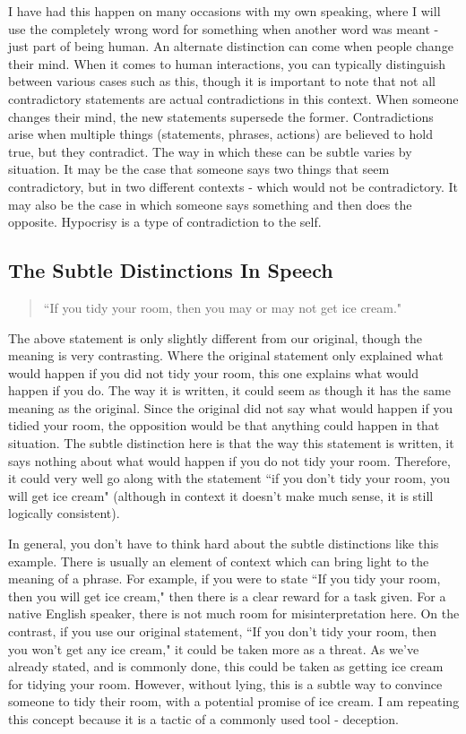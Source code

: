 \documentclass[10pt, a4paper, twocolumn]{book}
\begin{document}
I have had this happen on many occasions with my own speaking, where I will use the completely wrong word for something when another word was meant - just part of being human. An alternate distinction can come when people change their mind. When it comes to human interactions, you can typically distinguish between various cases such as this, though it is important to note that not all contradictory statements are actual contradictions in this context. When someone changes their mind, the new statements supersede the former. Contradictions arise when multiple things (statements, phrases, actions) are believed to hold true, but they contradict. The way in which these can be subtle varies by situation. It may be the case that someone says two things that seem contradictory, but in two different contexts - which would not be contradictory. It may also be the case in which someone says something and then does the opposite. Hypocrisy is a type of contradiction to the self.

\subsection{The Subtle Distinctions In Speech}

\begin{quotation}
	``If you tidy your room, then you may or may not get ice cream."
\end{quotation}

The above statement is only slightly different from our original, though the meaning is very contrasting. Where the original statement only explained what would happen if you did not tidy your room, this one explains what would happen if you do. The way it is written, it could seem as though it has the same meaning as the original. Since the original did not say what would happen if you tidied your room, the opposition would be that anything could happen in that situation. The subtle distinction here is that the way this statement is written, it says nothing about what would happen if you do not tidy your room. Therefore, it could very well go along with the statement ``if you don't tidy your room, you will get ice cream" (although in context it doesn't make much sense, it is still logically consistent). 

In general, you don't have to think hard about the subtle distinctions like this example. There is usually an element of context which can bring light to the meaning of a phrase. For example, if you were to state ``If you tidy your room, then you will get ice cream," then there is a clear reward for a task given. For a native English speaker, there is not much room for misinterpretation here. On the contrast, if you use our original statement, ``If you don't tidy your room, then you won't get any ice cream," it could be taken more as a threat. As we've already stated, and is commonly done, this could be taken as getting ice cream for tidying your room. However, without lying, this is a subtle way to convince someone to tidy their room, with a potential promise of ice cream. I am repeating this concept because it is a tactic of a commonly used tool - deception. 
\end{document}
